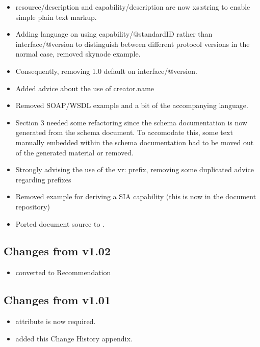 \documentclass[11pt,a4paper]{ivoa}
\begin{document}
\begin{itemize}
\item resource/description and capability/description are now xs:string
to enable simple plain text markup.

\item Adding language on using capability/@standardID rather than
interface/@version to distinguish between different protocol versions in
the normal case, removed skynode example.

\item Consequently, removing 1.0 default on interface/@version.

\item Added advice about the use of creator.name

\item Removed SOAP/WSDL example and a bit of the accompanying language.

\item Section 3 needed some refactoring since the schema documentation
is now generated from the schema document.  To accomodate this, some
text manually embedded within the schema documentation had to be moved
out of the generated material or removed.

\item Strongly advising the use of the vr: prefix, removing some
duplicated advice regarding prefixes

\item Removed example for deriving a SIA capability (this is now
in the document repository)

\item Ported document source to \ivoatex.
\end{itemize}

\subsection{Changes from v1.02}
\begin{itemize}
  \item converted to Recommendation
\end{itemize}

\subsection{Changes from v1.01}
\begin{itemize}
  \item {} attribute is now required.
  \item added this Change History appendix.
\end{itemize}
\end{document}

